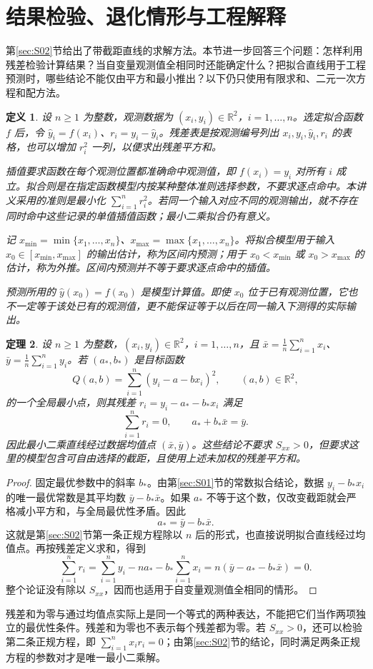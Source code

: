 \documentclass[UTF8,fontset=fandol,11pt]{ctexart}
\newtheorem{definition}{定义}[section]
\newtheorem{theorem}[definition]{定理}
\begin{document}
\section{结果检验、退化情形与工程解释}\label{sec:S03}
第\ref{sec:S02}节给出了带截距直线的求解方法。本节进一步回答三个问题：怎样利用残差检验计算结果？当自变量观测值全相同时还能确定什么？把拟合直线用于工程预测时，哪些结论不能仅由平方和最小推出？以下仍只使用有限求和、二元一次方程和配方法。\par
\begin{definition}
设 $n\geq1$ 为整数，观测数据为 $(x_i,y_i)\in\mathbb{R}^2$，$i=1,\ldots,n$。选定拟合函数 $f$ 后，令 $\hat{y}_i=f(x_i)$、$r_i=y_i-\hat{y}_i$。残差表是按观测编号列出 $x_i,y_i,\hat{y}_i,r_i$ 的表格，也可以增加 $r_i^2$ 一列，以便求出残差平方和。

插值要求函数在每个观测位置都准确命中观测值，即 $f(x_i)=y_i$ 对所有 $i$ 成立。拟合则是在指定函数模型内按某种整体准则选择参数，不要求逐点命中。本讲义采用的准则是最小化 $\sum_{i=1}^{n}r_i^2$。若同一个输入对应不同的观测输出，就不存在同时命中这些记录的单值插值函数；最小二乘拟合仍有意义。

记 $x_{\min}=\min\{x_1,\ldots,x_n\}$、$x_{\max}=\max\{x_1,\ldots,x_n\}$。将拟合模型用于输入 $x_0\in[x_{\min},x_{\max}]$ 的输出估计，称为区间内预测；用于 $x_0<x_{\min}$ 或 $x_0>x_{\max}$ 的估计，称为外推。区间内预测并不等于要求逐点命中的插值。

预测所用的 $\hat{y}(x_0)=f(x_0)$ 是模型计算值。即使 $x_0$ 位于已有观测位置，它也不一定等于该处已有的观测值，更不能保证等于以后在同一输入下测得的实际输出。
\end{definition}
\begin{theorem}
设 $n\geq1$ 为整数，$(x_i,y_i)\in\mathbb{R}^2$，$i=1,\ldots,n$，且 $\bar{x}=\frac1n\sum_{i=1}^{n}x_i$、$\bar{y}=\frac1n\sum_{i=1}^{n}y_i$。若 $(a_*,b_*)$ 是目标函数
\[
Q(a,b)=\sum_{i=1}^{n}(y_i-a-bx_i)^2,\qquad (a,b)\in\mathbb{R}^2,
\]
的一个全局最小点，则其残差 $r_i=y_i-a_*-b_*x_i$ 满足
\[
\sum_{i=1}^{n}r_i=0,\qquad a_*+b_*\bar{x}=\bar{y}.
\]
因此最小二乘直线经过数据均值点 $(\bar{x},\bar{y})$。这些结论不要求 $S_{xx}>0$，但要求这里的模型包含可自由选择的截距，且使用上述未加权的残差平方和。
\end{theorem}
\begin{proof}
固定最优参数中的斜率 $b_*$。由第\ref{sec:S01}节的常数拟合结论，数据 $y_i-b_*x_i$ 的唯一最优常数是其平均数 $\bar{y}-b_*\bar{x}$。如果 $a_*$ 不等于这个数，仅改变截距就会严格减小平方和，与全局最优性矛盾。因此
\[
a_* =\bar{y}-b_*\bar{x}.
\]
这就是第\ref{sec:S02}节第一条正规方程除以 $n$ 后的形式，也直接说明拟合直线经过均值点。再按残差定义求和，得到
\[
\sum_{i=1}^{n}r_i
=\sum_{i=1}^{n}y_i-na_*-b_*\sum_{i=1}^{n}x_i
=n(\bar{y}-a_*-b_*\bar{x})=0.
\]
整个论证没有除以 $S_{xx}$，因而也适用于自变量观测值全相同的情形。
\end{proof}
残差和为零与通过均值点实际上是同一个等式的两种表达，不能把它们当作两项独立的最优性条件。残差和为零也不表示每个残差都为零。若 $S_{xx}>0$，还可以检验第二条正规方程，即 $\sum_{i=1}^{n}x_i r_i=0$；由第\ref{sec:S02}节的结论，同时满足两条正规方程的参数对才是唯一最小二乘解。
\end{document}
